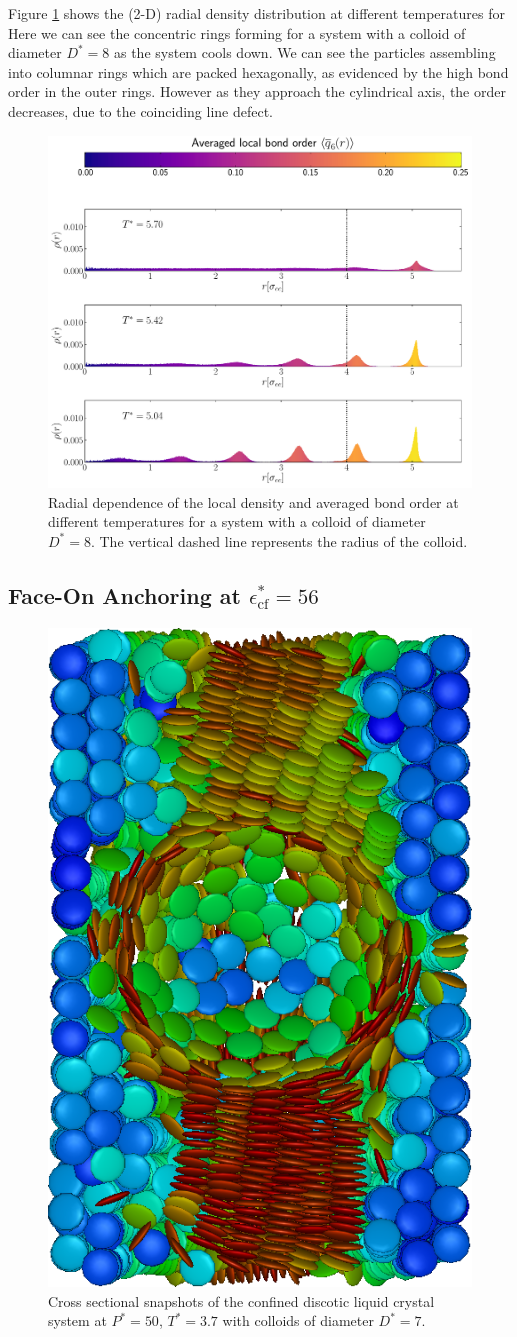 Figure \ref{fig:ceoC8raddens} shows the (2-D) radial density distribution
at different temperatures for 
Here we can see the concentric rings forming for a system with a colloid of diameter $D^*=8$ as the system cools down. We can see the particles assembling into columnar rings which are packed hexagonally, as evidenced by the high bond order in the outer rings. However as they approach the cylindrical axis, the order decreases, due to the coinciding line defect.

\begin{figure}[H]
    \centering
	\includegraphics[width=0.8\linewidth]{plots/ceo_W8C8_raddensD8.pdf}
	\caption{Radial dependence of the local density and averaged bond order at different temperatures for a system with a colloid of diameter $D^* = 8$. The vertical dashed line represents the radius of the colloid.}
    \label{fig:ceoC8raddens}
\end{figure}




\subsection{Face-On Anchoring at $\epsilon_{\text{cf}}^*= 56$}


\begin{figure}[H]
 \centering
 \includegraphics[width=.2\linewidth]{images/cfo_W8C56_D7.png}
\caption{Cross sectional snapshots of the confined discotic liquid crystal system at $P^* = 50$, $T^* = 3.7$ with colloids of diameter $D^*=7 $.}
 \label{fig:cfosnapshots}
\end{figure}

